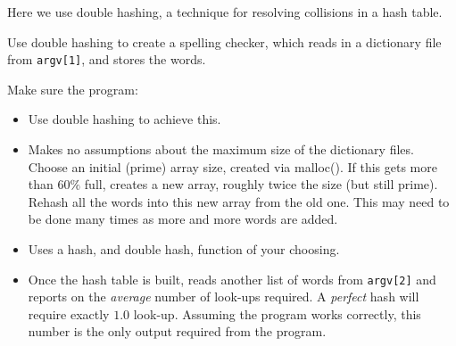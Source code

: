 Here we use double hashing, a technique for resolving collisions in a
hash table.

\begin{exercise}
\label{ex:dblhash}
Use double hashing to create a spelling checker, which reads in a dictionary file
from \verb^argv[1]^, and stores the words.

Make sure the program:
\begin{itemize}
\item Use double hashing to achieve this.
\item Makes no assumptions about the maximum size of the dictionary files. Choose
an initial (prime) array size, created via malloc(). If this gets more than $60\%$ full,
creates a new array, roughly twice the size (but still prime). Rehash all the words into this
new array from the old one. This may need to be done many times as more and more words
are added.
\item Uses a hash, and double hash, function of your choosing.
\item Once the hash table is built, reads another list of words from \verb^argv[2]^
and reports on the {\em average} number of  look-ups required. A {\em perfect} hash
will require exactly $1.0$ look-up. Assuming the program works correctly,
this number is the only output required from the program.
\end{itemize}
\end{exercise}
